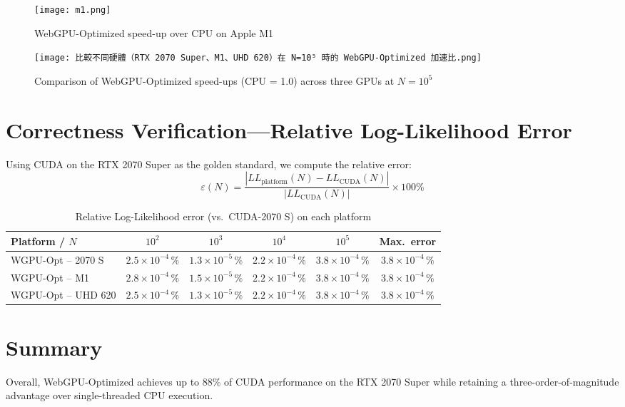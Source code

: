 \documentclass[PhD]{PHlab-thesis}
\begin{document}
\begin{figure}[h]
    \centering
    \texttt{[image: m1.png]}
    \caption{WebGPU-Optimized speed-up over CPU on Apple M1}
    \label{fig:m1}
\end{figure}

\begin{figure}[h]
    \centering
    \texttt{[image: 比較不同硬體（RTX 2070 Super、M1、UHD 620）在 N=10⁵ 時的 WebGPU-Optimized 加速比.png]}
    \caption{Comparison of WebGPU-Optimized speed-ups (CPU = 1.0) across three GPUs at $N=10^5$}
    \label{fig:cross-hw1}
\end{figure}
\clearpage

\section{Correctness Verification—Relative Log-Likelihood Error}
Using CUDA on the RTX 2070 Super as the golden standard, we compute the relative error:
\[
\varepsilon(N) = \frac{|LL_{\text{platform}}(N) - LL_{\text{CUDA}}(N)|}{|LL_{\text{CUDA}}(N)|} \times 100\%
\]

\begin{table}[h]
  \centering
  \caption{Relative Log-Likelihood error (vs.\ CUDA-2070 S) on each platform}
  \label{tab:likelihood_error}
  \setlength{\tabcolsep}{6pt}
  \renewcommand{\arraystretch}{1.7}
  \small
  \begin{tabularx}{\textwidth}{@{} X c c c c c @{}}
    \toprule
    Platform / $N$      & $10^2$           & $10^3$           & $10^4$           & $10^5$           & Max.\ error    \\
    \midrule
    WGPU-Opt -- 2070 S  & $2.5\times10^{-4}\,\%$ & $1.3\times10^{-5}\,\%$ & $2.2\times10^{-4}\,\%$ & $3.8\times10^{-4}\,\%$ & $3.8\times10^{-4}\,\%$ \\
    WGPU-Opt -- M1      & $2.8\times10^{-4}\,\%$ & $1.5\times10^{-5}\,\%$ & $2.2\times10^{-4}\,\%$ & $3.8\times10^{-4}\,\%$ & $3.8\times10^{-4}\,\%$ \\
    WGPU-Opt -- UHD 620 & $2.5\times10^{-4}\,\%$ & $1.3\times10^{-5}\,\%$ & $2.2\times10^{-4}\,\%$ & $3.8\times10^{-4}\,\%$ & $3.8\times10^{-4}\,\%$ \\
    \bottomrule
  \end{tabularx}
\end{table}


\section{Summary}
Overall, WebGPU-Optimized achieves up to 88\% of CUDA performance on the RTX 2070 Super while retaining a three-order-of-magnitude advantage over single-threaded CPU execution.
\end{document}

